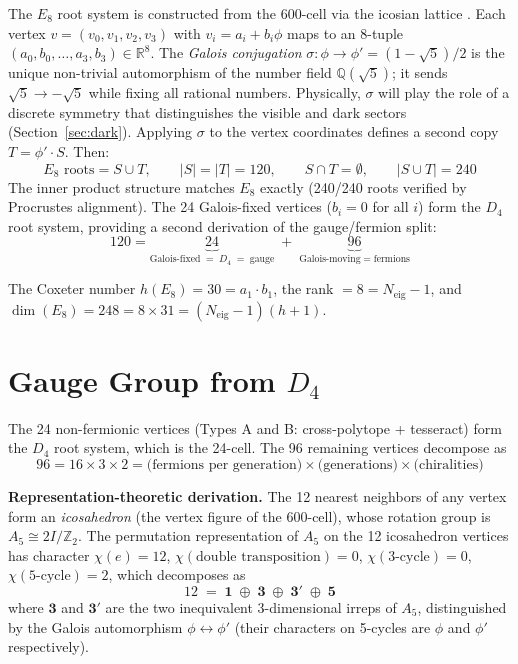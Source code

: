 \documentclass[12pt,a4paper]{article}
\theoremstyle{definition}
\begin{document}
The $E_8$ root system is constructed from the 600-cell via the icosian lattice \cite{conway1998icosian,elser1987}. Each vertex $v = (v_0, v_1, v_2, v_3)$ with $v_i = a_i + b_i\phi$ maps to an 8-tuple $(a_0, b_0, \ldots, a_3, b_3) \in \mathbb{R}^8$.  The \emph{Galois conjugation} $\sigma: \phi \to \phi' = (1-\sqrt{5})/2$ is the unique non-trivial automorphism of the number field $\mathbb{Q}(\sqrt{5})$; it sends $\sqrt{5} \to -\sqrt{5}$ while fixing all rational numbers.  Physically, $\sigma$ will play the role of a discrete symmetry that distinguishes the visible and dark sectors (Section~\ref{sec:dark}).  Applying $\sigma$ to the vertex coordinates defines a second copy $T = \phi' \cdot S$. Then:
\begin{equation}
\boxed{E_8 \text{ roots} = S \cup T, \qquad |S| = |T| = 120, \qquad S \cap T = \emptyset, \qquad |S \cup T| = 240}
\end{equation}
The inner product structure matches $E_8$ exactly (240/240 roots verified by Procrustes alignment). The 24 Galois-fixed vertices ($b_i = 0$ for all $i$) form the $D_4$ root system, providing a second derivation of the gauge/fermion split:
\begin{equation}
120 = \underbrace{24}_{\text{Galois-fixed} \;=\; D_4 \;=\; \text{gauge}} \;+\; \underbrace{96}_{\text{Galois-moving} \;=\; \text{fermions}}
\end{equation}

The Coxeter number $h(E_8) = 30 = a_1 \cdot b_1$, the rank $= 8 = N_{\text{eig}} - 1$, and $\dim(E_8) = 248 = 8 \times 31 = (N_{\text{eig}}-1)(h+1)$.


\section{Gauge Group from \texorpdfstring{$D_4$}{D4}}
\label{sec:gauge}

The 24 non-fermionic vertices (Types A and B: cross-polytope + tesseract) form the $D_4$ root system, which is the 24-cell. The 96 remaining vertices decompose as
\begin{equation}
96 = 16 \times 3 \times 2 = \text{(fermions per generation)} \times \text{(generations)} \times \text{(chiralities)}
\end{equation}

\textbf{Representation-theoretic derivation.}  The 12 nearest neighbors of any vertex form an \emph{icosahedron} (the vertex figure of the 600-cell), whose rotation group is $A_5\cong 2I/\mathbb{Z}_2$.  The permutation representation of $A_5$ on the 12 icosahedron vertices has character $\chi(e)=12$, $\chi(\text{double transposition})=0$, $\chi(\text{3-cycle})=0$, $\chi(\text{5-cycle})=2$, which decomposes as
\begin{equation}
12 \;=\; \mathbf{1} \;\oplus\; \mathbf{3} \;\oplus\; \mathbf{3'} \;\oplus\; \mathbf{5}
\label{eq:A5decomp}
\end{equation}
where $\mathbf{3}$ and $\mathbf{3'}$ are the two inequivalent 3-dimensional irreps of $A_5$, distinguished by the Galois automorphism $\phi\leftrightarrow\phi'$ (their characters on 5-cycles are $\phi$ and $\phi'$ respectively).
\end{document}
